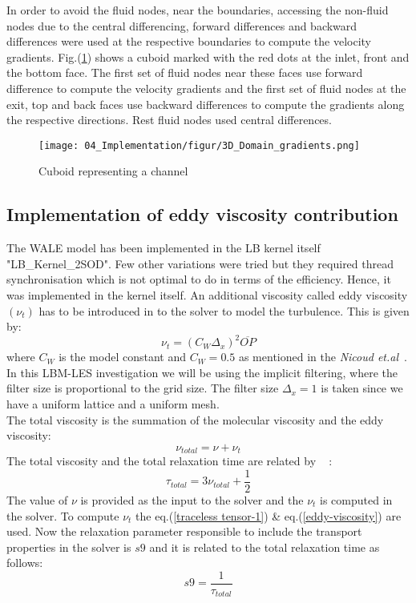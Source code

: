 In order to avoid the fluid nodes, near the boundaries, accessing the non-fluid nodes due to the central differencing, forward differences and backward differences were used at the respective boundaries to compute the velocity gradients. Fig.(\ref{Finite differences bound}) shows a cuboid marked with the red dots at the inlet, front and the bottom face. The first set of fluid nodes near these faces use forward difference to compute the velocity gradients and the first set of fluid nodes at the exit, top and back faces use backward differences to compute the gradients along the respective directions. Rest fluid nodes used central differences.

\begin{figure}[t]
\centering
\texttt{[image: 04\_Implementation/figur/3D\_Domain\_gradients.png]}
\label{Finite differences bound}
\caption{Cuboid representing a channel}
\end{figure}
\subsection{Implementation of eddy viscosity contribution}

The WALE model has been implemented in the LB kernel itself "LB\_Kernel\_2SOD". Few other variations were tried but they required thread synchronisation which is not optimal to do in terms of the efficiency. Hence, it was implemented in the kernel itself. An additional viscosity called eddy viscosity $\left(\nu_t\right)$ has to be introduced in to the solver to model the turbulence. This is given by:
%
\begin{equation}
\label{Eddy viscosity}
\nu_t = \left(C_W \Delta_x \right)^2 \overline{OP}
\end{equation}
%
where $C_W$ is the model constant and $C_W = 0.5 $ as mentioned in the \emph{Nicoud et.al}~\cite{nicoud:WALE}. In this LBM-LES investigation we will be using the implicit filtering, where the filter size is proportional to the grid size. The filter size $\Delta_x = 1$ is taken since we have a uniform lattice and a uniform mesh. \\
The total viscosity is the summation of the molecular viscosity and the eddy viscosity:
%
\begin{equation}
\label{Total viscosity}
\nu_{total} = \nu + \nu_t
\end{equation}
%
The total viscosity and the total relaxation time are related by ~\cite{weickert:LES} :
%
\begin{equation}
\label{Total rel. time}
\tau_{total} = 3\nu_{total} + \frac{1}{2}
\end{equation}
%
The value of $\nu$ is provided as the input to the solver and the $\nu_t$ is computed in the solver. To compute $\nu_t$ the eq.(\ref{traceless tensor-1}) \& eq.(\ref{eddy-viscosity}) are used. Now the relaxation parameter responsible to include the transport properties in the solver is $s9$ and it is related to the total relaxation time as follows:
%
\begin{equation}
\label{s9}
s9 = \frac{1}{\tau_{total}}
\end{equation}
%
